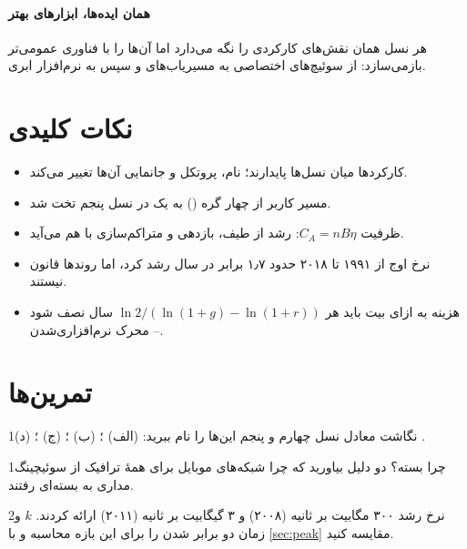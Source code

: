 \documentclass[11pt,a4paper]{article}
\begin{document}
\paragraph{همان ایده‌ها، ابزارهای بهتر} هر نسل همان نقش‌های کارکردی را نگه می‌دارد اما آن‌ها را با فناوری عمومی‌تر بازمی‌سازد: از سوئیچ‌های اختصاصی
به مسیریاب‌های  و سپس به نرم‌افزار ابری.

\section{نکات کلیدی}
\begin{takeawaybox}
\begin{itemize}
  \item کارکردها میان نسل‌ها پایدارند؛ نام، پروتکل و جانمایی آن‌ها تغییر می‌کند.
  \item مسیر کاربر از چهار گره () به یک  در نسل پنجم تخت شد.
  \item ظرفیت $C_A = nB\eta$: رشد از طیف، بازدهی و متراکم‌سازی با هم می‌آید.
  \item نرخ اوج از ۱۹۹۱ تا ۲۰۱۸ حدود ۱٫۷ برابر در سال رشد کرد، اما روندها قانون نیستند.
  \item هزینه به ازای بیت باید هر $\ln 2/(\ln(1+g) - \ln(1+r))$ سال نصف شود -- محرک نرم‌افزاری‌شدن.
\end{itemize}
\end{takeawaybox}

\section{تمرین‌ها}

\begin{exercisebox}{1}{نگاشت}\label{exr:map}
معادل نسل چهارم و پنجم این‌ها را نام ببرید: (الف) ؛ (ب) ؛ (ج) ؛ (د) .
\end{exercisebox}

\begin{exercisebox}{1}{چرا بسته؟}\label{exr:why}
دو دلیل بیاورید که چرا شبکه‌های موبایل برای همهٔ ترافیک از سوئیچینگ مداری به بسته‌ای رفتند.
\end{exercisebox}

\begin{exercisebox}{2}{نرخ رشد}\label{exr:cagr}
 ۳۰۰ مگابیت بر ثانیه (۲۰۰۸) و  ۳ گیگابیت بر ثانیه (۲۰۱۱) ارائه کردند. $k$ و زمان دو برابر شدن را برای این بازه محاسبه و با
\cref{sec:peak} مقایسه کنید.
\end{exercisebox}
\end{document}
